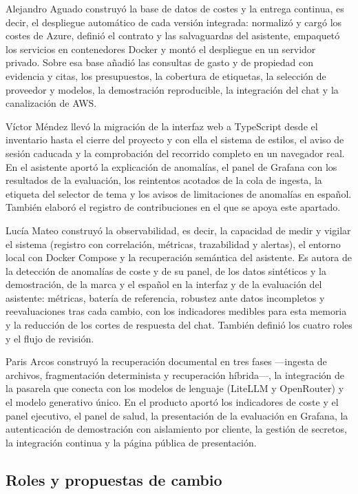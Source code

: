 Alejandro Aguado construyó la base de datos de costes y la entrega continua, es decir, el despliegue automático de cada versión integrada: normalizó y cargó los costes de Azure, definió el contrato y las salvaguardas del asistente, empaquetó los servicios en contenedores Docker y montó el despliegue en un servidor privado. Sobre esa base añadió las consultas de gasto y de propiedad con evidencia y citas, los presupuestos, la cobertura de etiquetas, la selección de proveedor y modelos, la demostración reproducible, la integración del chat y la canalización de AWS.

Víctor Méndez llevó la migración de la interfaz web a TypeScript desde el inventario hasta el cierre del proyecto y con ella el sistema de estilos, el aviso de sesión caducada y la comprobación del recorrido completo en un navegador real. En el asistente aportó la explicación de anomalías, el panel de Grafana con los resultados de la evaluación, los reintentos acotados de la cola de ingesta, la etiqueta del selector de tema y los avisos de limitaciones de anomalías en español. También elaboró el registro de contribuciones en el que se apoya este apartado.

Lucía Mateo construyó la observabilidad, es decir, la capacidad de medir y vigilar el sistema (registro con correlación, métricas, trazabilidad y alertas), el entorno local con Docker Compose y la recuperación semántica del asistente. Es autora de la detección de anomalías de coste y de su panel, de los datos sintéticos y la demostración, de la marca y el español en la interfaz y de la evaluación del asistente: métricas, batería de referencia, robustez ante datos incompletos y reevaluaciones tras cada cambio, con los indicadores medibles para esta memoria y la reducción de los cortes de respuesta del chat. También definió los cuatro roles y el flujo de revisión.

Paris Arcos construyó la recuperación documental en tres fases ---ingesta de archivos, fragmentación determinista y recuperación híbrida---, la integración de la pasarela que conecta con los modelos de lenguaje (LiteLLM y OpenRouter) y el modelo generativo único. En el producto aportó los indicadores de coste y el panel ejecutivo, el panel de salud, la presentación de la evaluación en Grafana, la autenticación de demostración con aislamiento por cliente, la gestión de secretos, la integración continua y la página pública de presentación.

\subsection{Roles y propuestas de cambio}\label{c-2}

